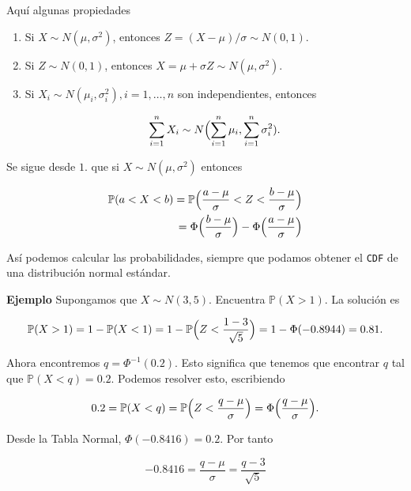 \documentclass{article}\usepackage[]{graphicx}\usepackage[]{color}
\begin{document}
\vspace{0.2cm}

Aqu\'i algunas propiedades

\begin{enumerate}
\item Si $X \sim N(\mu, \sigma^2)$, entonces $Z = (X - \mu)/\sigma \sim N(0,1)$.
\item Si $Z \sim N(0,1)$, entonces $X = \mu + \sigma Z \sim N(\mu, \sigma^2) $.
\item Si $X_i \sim N(\mu_i, \sigma_i^2), i=1,\dots,n$  son independientes, entonces

\[
\sum_{i = 1}^{n}X_i \sim N\Bigl(\sum_{i = 1}^{n}\mu_i, \sum_{i = 1}^{n}\sigma_i^2).
\]
\end{enumerate}
Se sigue desde $1.$ que si $X \sim N(\mu, \sigma^2)$ entonces

\begin{align*}
\mathbb{P}(a < X < b) = \mathbb{P}\Bigl( \frac{a - \mu}{\sigma} < Z < \frac{b - \mu}{\sigma}\Bigr)\\
= \Phi \Bigl( \frac{b - \mu}{\sigma} \Bigr) - \Phi \Bigl( \frac{a - \mu}{\sigma} \Bigr)
\end{align*}

\vspace{0.2cm}

As\'i podemos calcular las probabilidades, siempre que podamos obtener el \texttt{CDF} de una distribuci\'on normal est\'andar.


\vspace{0.5cm}


\textbf{Ejemplo} Supongamos que $X \sim N(3, 5)$. Encuentra $\mathbb{P}(X > 1)$. La soluci\'on es

\[
\mathbb{P}(X > 1) = 1 -\mathbb{P}(X < 1) = 1 -\mathbb{P}\Bigl(Z < \frac{1 -3}{\sqrt{5}}  \Bigr) = 1- \Phi(-0.8944) = 0.81.
\]

\vspace{0.3cm}

Ahora encontremos $q = \Phi^{-1}(0.2)$. Esto significa que tenemos que encontrar $q$ tal que $\mathbb{P}(X < q) = 0.2$. Podemos resolver esto, escribiendo

\[
0.2 = \mathbb{P}(X < q) = \mathbb{P}\Bigl(Z < \frac{q - \mu}{\sigma} \Bigr) = \Phi\Bigl(\frac{q - \mu}{\sigma} \Bigr).
\]

\vspace{0.2cm}

Desde la Tabla Normal, $\Phi(-0.8416) = 0.2$. Por tanto

\[
-0.8416 = \frac{q - \mu}{\sigma} = \frac{q - 3}{\sqrt{5}}
\]
\end{document}
